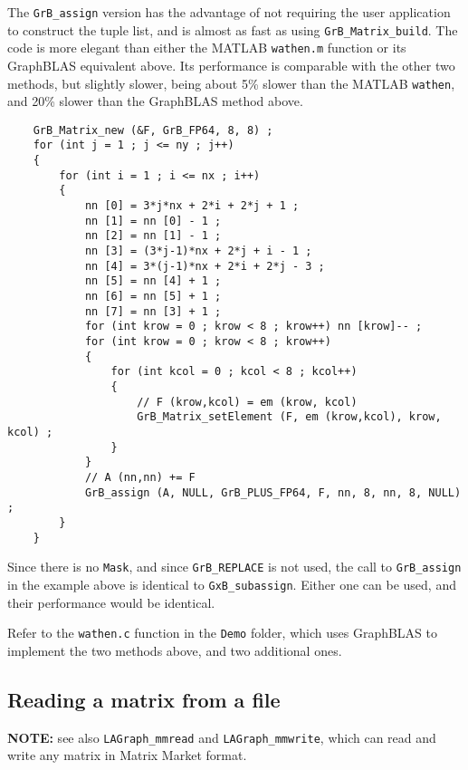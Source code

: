 \documentclass[12pt]{article}
\begin{document}
The \verb'GrB_assign' version has the advantage of not requiring the
user application to construct the tuple list, and is almost as fast as using
\verb'GrB_Matrix_build'.  The code is more elegant than either the MATLAB
\verb'wathen.m' function or its GraphBLAS equivalent above.  Its performance is
comparable with the other two methods, but slightly slower, being about 5\%
slower than the MATLAB \verb'wathen', and 20\% slower than the GraphBLAS
method above.

    {\footnotesize
    \begin{verbatim}
    GrB_Matrix_new (&F, GrB_FP64, 8, 8) ;
    for (int j = 1 ; j <= ny ; j++)
    {
        for (int i = 1 ; i <= nx ; i++)
        {
            nn [0] = 3*j*nx + 2*i + 2*j + 1 ;
            nn [1] = nn [0] - 1 ;
            nn [2] = nn [1] - 1 ;
            nn [3] = (3*j-1)*nx + 2*j + i - 1 ;
            nn [4] = 3*(j-1)*nx + 2*i + 2*j - 3 ;
            nn [5] = nn [4] + 1 ;
            nn [6] = nn [5] + 1 ;
            nn [7] = nn [3] + 1 ;
            for (int krow = 0 ; krow < 8 ; krow++) nn [krow]-- ;
            for (int krow = 0 ; krow < 8 ; krow++)
            {
                for (int kcol = 0 ; kcol < 8 ; kcol++)
                {
                    // F (krow,kcol) = em (krow, kcol)
                    GrB_Matrix_setElement (F, em (krow,kcol), krow, kcol) ;
                }
            }
            // A (nn,nn) += F
            GrB_assign (A, NULL, GrB_PLUS_FP64, F, nn, 8, nn, 8, NULL) ;
        }
    } \end{verbatim}}

Since there is no \verb'Mask', and since \verb'GrB_REPLACE' is not used, the call
to \verb'GrB_assign' in the example above is identical to \verb'GxB_subassign'.
Either one can be used, and their performance would be identical.

Refer to the \verb'wathen.c' function in the \verb'Demo' folder, which
uses GraphBLAS to implement the two methods above, and two additional ones.

\newpage
\subsection{Reading a matrix from a file}
\label{read}

{\bf NOTE:} see also \verb'LAGraph_mmread' and \verb'LAGraph_mmwrite', which
can read and write any matrix in Matrix Market format.
\end{document}
